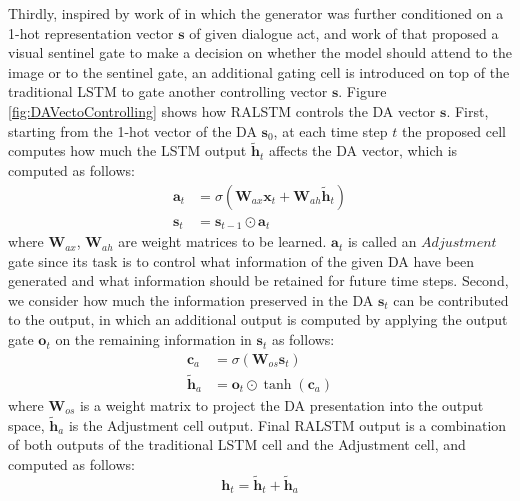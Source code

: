\documentclass[11pt,a4paper]{article}
\begin{document}
Thirdly, inspired by work of \citet{wensclstm15} in which the generator was further conditioned on a 1-hot representation vector $\textbf{s}$ of given dialogue act, and work of \citet{lu2016knowing} that proposed a visual sentinel gate to make a decision on whether the model should attend to the image or to the sentinel gate, an additional gating cell is introduced on top of the traditional LSTM to gate another controlling vector $\textbf{s}$. Figure \ref{fig:DAVectoControlling} shows how RALSTM controls the DA vector $\textbf{s}$. First, starting from the 1-hot vector of the DA $\textbf{s}_{0}$, at each time step $t$ the proposed cell computes how much the LSTM output $\tilde{\textbf{h}}_{t}$ affects the DA vector, which is computed as follows:
\begin{equation}\label{eq:a-t-1}
\begin{aligned}
\textbf{a}_{t}&=\sigma(\textbf{W}_{ax}\textbf{x}_{t} +\textbf{W}_{ah}\tilde{\textbf{h}}_{t})\\
\textbf{s}_{t}&=\textbf{s}_{t-1} \odot \textbf{a}_{t}
\end{aligned}
\end{equation}
where $\textbf{W}_{ax}$, $\textbf{W}_{ah}$ are weight matrices to be learned. $\textbf{a}_{t}$ is called an $Adjustment$ gate since its task is to control what information of the given DA have been generated and what information should be retained for future time steps. Second, we consider how much the information preserved in the DA $\textbf{s}_{t}$ can be contributed to the output, in which an additional output is computed by applying the output gate $\textbf{o}_{t}$ on the remaining information in $\textbf{s}_{t}$ as follows:
\begin{equation}\label{eq:h-a-1}
\begin{aligned}
\textbf{c}_{a}&=\sigma(\textbf{W}_{os}\textbf{s}_{t})\\
\tilde{\textbf{h}}_{a}&= \textbf{o}_{t} \odot \tanh(\textbf{c}_{a})
\end{aligned}
\end{equation}
where $\textbf{W}_{os}$ is a weight matrix to project the DA presentation into the output space, $\tilde{\textbf{h}}_{a}$ is the Adjustment cell output. Final RALSTM output is a combination of both outputs of the traditional LSTM cell and the Adjustment cell, and computed as follows:
\begin{equation}\label{eq:h-t-1}
\textbf{h}_{t}=\tilde{\textbf{h}}_{t} + \tilde{\textbf{h}}_{a}
\end{equation}
\end{document}
